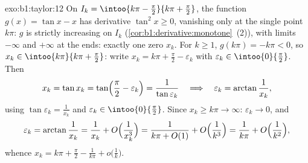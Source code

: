 \begin{solution}{exo:b1:taylor:12}
On $I_k = \intoo{k\pi - \frac\pi2}{k\pi + \frac\pi2}$, the
function $g(x) = \tan x - x$ has derivative $\tan^2 x \geq 0$,
vanishing only at the single point $k\pi$: $g$ is strictly
increasing on $I_k$ (\cref{cor:b1:derivative:monotone}~(2)),
with limits $-\infty$ and $+\infty$ at the ends: exactly one
zero $x_k$. For $k \geq 1$, $g(k\pi) = -k\pi < 0$, so $x_k \in
\intoo{k\pi}{k\pi + \frac\pi2}$: write $x_k = k\pi + \frac\pi2 -
\varepsilon_k$ with $\varepsilon_k \in \intoo{0}{\frac\pi2}$.
Then
\[
x_k = \tan x_k = \tan\Bigl(\frac\pi2 - \varepsilon_k\Bigr)
= \frac{1}{\tan\varepsilon_k}
\quad\Longrightarrow\quad
\varepsilon_k = \arctan\frac{1}{x_k} ,
\]
using $\tan\varepsilon_k = \frac{1}{x_k}$ and $\varepsilon_k \in
\intoo{0}{\frac\pi2}$. Since $x_k \geq k\pi \to \infty$:
$\varepsilon_k \to 0$, and
\[
\varepsilon_k = \arctan\frac{1}{x_k} = \frac{1}{x_k} +
O\Bigl(\frac{1}{x_k^3}\Bigr)
= \frac{1}{k\pi + O(1)} + O\Bigl(\frac{1}{k^3}\Bigr)
= \frac{1}{k\pi} + O\Bigl(\frac{1}{k^2}\Bigr) ,
\]
whence $x_k = k\pi + \frac\pi2 - \frac{1}{k\pi} +
o\bigl(\frac1k\bigr)$.
\end{solution}

